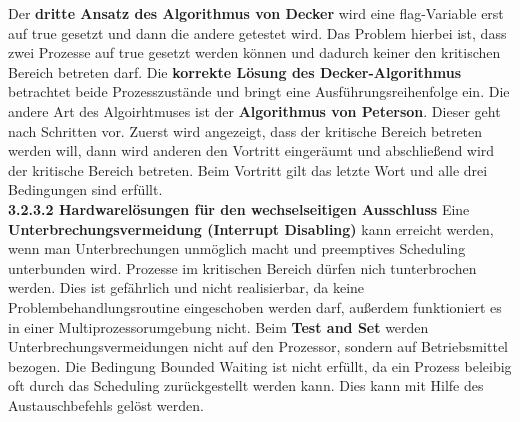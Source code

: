 \documentclass{article}
\begin{document}
    Der \textbf{dritte Ansatz des Algorithmus von Decker} wird eine flag-Variable erst auf true gesetzt und dann die andere getestet wird. Das Problem hierbei ist, dass zwei Prozesse auf true gesetzt werden können und dadurch keiner den kritischen Bereich betreten darf.\newline
    Die \textbf{korrekte Lösung des Decker-Algorithmus} betrachtet beide Prozesszustände und bringt eine Ausführungsreihenfolge ein.\newline
    Die andere Art des Algoirhtmuses ist der \textbf{Algorithmus von Peterson}. Dieser geht nach Schritten vor. Zuerst wird angezeigt, dass der kritische Bereich betreten werden will, dann wird anderen den Vortritt eingeräumt und abschließend wird der kritische Bereich betreten. Beim Vortritt gilt das letzte Wort und alle drei Bedingungen sind erfüllt.\newline 
    \\
    \textbf{3.2.3.2 Hardwarelösungen für den wechselseitigen Ausschluss}\newline
    Eine \textbf{Unterbrechungsvermeidung (Interrupt Disabling)} kann erreicht werden, wenn man Unterbrechungen unmöglich macht und preemptives Scheduling unterbunden wird. Prozesse im kritischen Bereich dürfen nich tunterbrochen werden. Dies ist gefährlich und nicht realisierbar, da keine Problembehandlungsroutine eingeschoben werden darf, außerdem funktioniert es in einer Multiprozessorumgebung nicht.\newline
    Beim \textbf{Test and Set} werden Unterbrechungsvermeidungen nicht auf den Prozessor, sondern auf Betriebsmittel bezogen. Die Bedingung Bounded Waiting ist nicht erfüllt, da ein Prozess beleibig oft durch das Scheduling zurückgestellt werden kann. Dies kann mit Hilfe des Austauschbefehls gelöst werden.\newline
\end{document}
